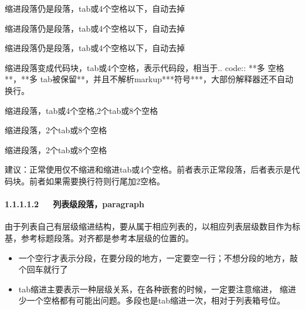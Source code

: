\documentclass[letterpaper,12pt,english]{sphinxmanual}
\begin{document}
缩进段落仍是段落，tab或4个空格以下，自动去掉

缩进段落仍是段落，tab或4个空格以下，自动去掉

缩进段落仍是段落，tab或4个空格以下，自动去掉

\begin{sphinxVerbatim}[commandchars=\\\{\}]
缩进段落变成代码块，tab或4个空格，表示代码段，相当于.. code:: **多   空格**，**多          tab被保留**，并且不解析markup***符号***，大部份解释器还不自动换行。

 缩进段落，\PYGZgt{}tab或4个空格,\PYGZlt{}2个tab或8个空格

    缩进段落，2个tab或8个空格

      缩进段落，\PYGZgt{}2个tab或8个空格
\end{sphinxVerbatim}

建议：正常使用仅不缩进和缩进tab或4个空格。前者表示正常段落，后者表示是代码块。前者如果需要换行符则行尾加2空格。


\paragraph{1.1.1.1.2   列表级段落，paragraph}
\label{\detokenize{001software/001install/001._u7f51_u7ad9/demo-markdown:id3}}
由于列表自己有层级缩进结构，要从属于相应列表的，以相应列表层级数目作为标基，参考标题段落。对齐都是参考本层级的位置的。
\begin{itemize}
\item {} 
一个空行才表示分段，在要分段的地方，一定要空一行；不想分段的地方，敲个回车就行了

\item {} 
tab缩进主要表示一种层级关系，在各种嵌套的时候，一定要注意缩进，
缩进少一个空格都有可能出问题。多段也是tab缩进一次，相对于列表箱号位。

\end{itemize}
\end{document}
